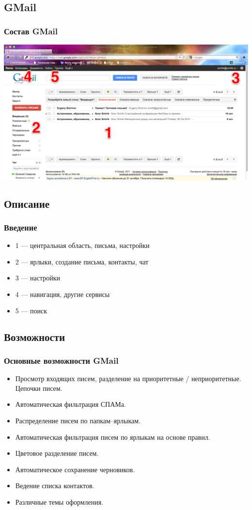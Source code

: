 \documentclass[compress,red]{beamer}
\begin{document}
\subsection{GMail}
\begin{frame}
  \frametitle{Состав GMail}
    \centerline{\includegraphics[width=1.0\textwidth]{images/gmail-03.png}}
\end{frame}

\subsection{Описание}
\begin{frame}[fragile]
  \frametitle{Введение}
	\begin{itemize}
	\item 1 --- центральная область, письма, настройки
	\item 2 --- ярлыки, создание письма, контакты, чат
	\item 3 --- настройки
	\item 4 --- навигация, другие сервисы
	\item 5 --- поиск
	\end{itemize}
\end{frame}

\subsection{Возможности}
\begin{frame}[fragile]
  \frametitle{Основные возможности GMail}
	\begin{itemize}
  	\item Просмотр входящих писем, разделение на приоритетные / неприоритетные. Цепочки писем.
  	\item Автоматическая фильтрация СПАМа.
  	\item Распределение писем по папкам--ярлыкам.
  	\item Автоматическая фильтрация писем по ярлыкам на основе правил.
  	\item Цветовое разделение писем.
  	\item Автоматическое сохранение черновиков.
  	\item Ведение списка контактов.
  	\item Различные темы оформления.
	\end{itemize}
\end{frame}
\end{document}
